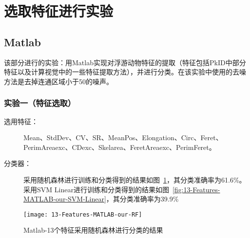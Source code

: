 \section{选取特征进行实验}
\subsection{Matlab}
该部分进行的实验：用Matlab实现对浮游动物特征的提取（特征包括PkID中部分特征以及计算视觉中的一些特征提取方法），并进行分类。在该实验中使用的去噪方法是去掉连通区域小于50的噪声。

%

\subsubsection{实验一（特征选取）}
\begin{description}
\item[选用特征：] Mean、StdDev、CV、SR、MeanPos、Elongation、Circ、Feret、PerimAreaexc、CDexc、Skelarea、FeretAreaexc、PerimFeret。
\item[分类器：] 采用随机森林进行训练和分类得到的结果如图~\ref{fig:13-Features-MATLAB-our-RF}，其分类准确率为61.6\%。采用SVM Linear进行训练和分类得到的结果如图~\ref{fig:13-Features-MATLAB-our-SVM-Linear}，其分类准确率为39.9\%
\end{description}
\begin{figure}[!ht]
\centering
\texttt{[image: 13-Features-MATLAB-our-RF]}
\caption{Matlab-13个特征采用随机森林进行分类的结果}
\label{fig:13-Features-MATLAB-our-RF}
\end{figure}

